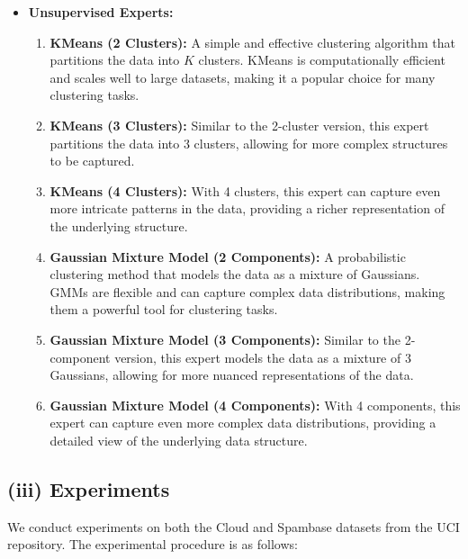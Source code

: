 \documentclass{article}
\begin{document}
\begin{itemize}
  \item \textbf{Unsupervised Experts:}
  \begin{enumerate}
      \item \textbf{KMeans (2 Clusters):} A simple and effective clustering algorithm that partitions the data into $K$ clusters. KMeans is computationally efficient and scales well to large datasets, making it a popular choice for many clustering tasks.
      \item \textbf{KMeans (3 Clusters):} Similar to the 2-cluster version, this expert partitions the data into 3 clusters, allowing for more complex structures to be captured.
      \item \textbf{KMeans (4 Clusters):} With 4 clusters, this expert can capture even more intricate patterns in the data, providing a richer representation of the underlying structure.
      \item \textbf{Gaussian Mixture Model (2 Components):} A probabilistic clustering method that models the data as a mixture of Gaussians. GMMs are flexible and can capture complex data distributions, making them a powerful tool for clustering tasks.
      \item \textbf{Gaussian Mixture Model (3 Components):} Similar to the 2-component version, this expert models the data as a mixture of 3 Gaussians, allowing for more nuanced representations of the data.
      \item \textbf{Gaussian Mixture Model (4 Components):} With 4 components, this expert can capture even more complex data distributions, providing a detailed view of the underlying data structure.
  \end{enumerate}

\end{itemize}

\subsection*{(iii) Experiments}

We conduct experiments on both the Cloud and Spambase datasets from the UCI repository. The experimental procedure is as follows:
\end{document}
